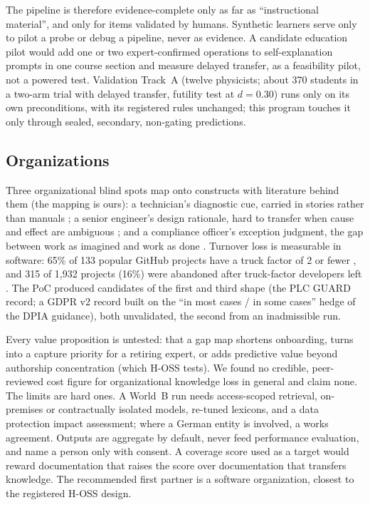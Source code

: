 \evint{} The pipeline is therefore evidence-complete only as far as \enquote{instructional material},
and only for items validated by humans. Synthetic learners serve only to pilot a probe or debug a
pipeline, never as evidence. A candidate education pilot would add one or two expert-confirmed operations
to self-explanation prompts in one course section and measure delayed transfer, as a feasibility pilot,
not a powered test. Validation Track~A (twelve physicists; about 370 students in a two-arm trial with
delayed transfer, futility test at $d = 0.30$) runs only on its own preconditions, with its registered
rules unchanged; this program touches it only through sealed, secondary, non-gating predictions.

\subsection{Organizations}

\evlit{} Three organizational blind spots map onto constructs with literature behind them (the mapping is ours): a technician's diagnostic cue,
carried in stories rather than manuals \parencite{orr1996talking}; a senior engineer's design rationale,
hard to transfer when cause and effect are ambiguous \parencite{szulanski1996exploring}; and a compliance officer's exception
judgment, the gap between work as imagined and work as done \parencite{hollnagel2018safety}. Turnover
loss is measurable in software: 65\% of 133 popular GitHub projects have a truck factor of 2 or fewer
\parencite{avelino2016novel}, and 315 of 1,932 projects (16\%) were abandoned after truck-factor
developers left \parencite{avelino2019abandonment}. \evobs{} The PoC produced candidates of the first and
third shape (the PLC GUARD record; a GDPR v2 record built on the \enquote{in most cases / in some cases}
hedge of the DPIA guidance), both unvalidated, the second from an inadmissible run.

\evhyp{} Every value proposition is untested: that a gap map shortens onboarding, turns into a capture
priority for a retiring expert, or adds predictive value beyond authorship concentration (which H-OSS
tests). We found no credible, peer-reviewed cost figure for organizational knowledge loss in general and
claim none. \evint{} The limits are hard ones. A World~B run needs access-scoped retrieval, on-premises
or contractually isolated models, re-tuned lexicons, and a data protection impact assessment; where a
German entity is involved, a works agreement. Outputs are aggregate by default, never feed performance
evaluation, and name a person only with consent. A coverage score used as a target would reward
documentation that raises the score over documentation that transfers knowledge. The recommended first
partner is a software organization, closest to the registered H-OSS design.
